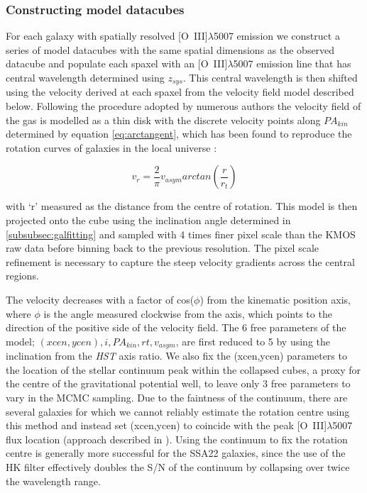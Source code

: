 \documentclass[fleqn,usenatbib]{mn2e}
\begin{document}
\subsubsection{Constructing model datacubes}\label{subsubec:model_cube}
For each galaxy with spatially resolved [O~{\sc III}]$\lambda$5007 emission we construct a series of model datacubes with the same spatial dimensions as the observed datacube and populate each spaxel with an [O~{\sc III}]$\lambda$5007 emission line that has central wavelength determined using $z_{sys}$.
This central wavelength is then shifted using the velocity derived at each spaxel from the velocity field model described below.  
Following the procedure adopted by numerous authors \citep[e.g.][]{Epinat2010,Epinat2012,Swinbank2012,Stott2016,Mason2016} the velocity field of the gas is modelled as a thin disk with the discrete velocity points along $PA_{kin}$ determined by equation \ref{eq:arctangent}, which has been found to reproduce the rotation curves of galaxies in the local universe \citep[e.g.][]{Courteau1997}:

\begin{equation}\label{eq:arctangent}
   v_{r} = \frac{2}{\pi}v_{asym}arctan\left(\frac{r}{r_{t}}\right)
\end{equation}

\noindent
with `r' measured as the distance from the centre of rotation.
This model is then projected onto the cube using the inclination angle determined in \cref{subsubsec:galfitting} and sampled with 4 times finer pixel scale than the KMOS raw data before binning back to the previous resolution.
The pixel scale refinement is necessary to capture the steep velocity gradients across the central regions.

The velocity decreases with a factor of cos($\phi$) from the kinematic position axis, where $\phi$ is the angle measured clockwise from the axis, which points to the direction of the positive side of the velocity field.
The 6 free parameters of the model; $(xcen, ycen), i, PA_{kin}, rt, v_{asym}$, are first reduced to 5 by using the inclination from the {\em HST} axis ratio.
We also fix the (xcen,ycen) parameters to the location of the stellar continuum peak within the collapsed cubes, a proxy for the centre of the gravitational potential well, to leave only 3 free parameters to vary in the MCMC sampling.
Due to the faintness of the continuum, there are several galaxies for which we cannot reliably estimate the rotation centre using this method and instead set (xcen,ycen) to coincide with the peak [O~{\sc III}]$\lambda$5007 flux location (approach described in \citealt{Harrison2017}).
Using the continuum to fix the rotation centre is generally more successful for the SSA22 galaxies, since the use of the HK filter effectively doubles the S/N of the continuum by collapsing over twice the wavelength range. \\
\end{document}
